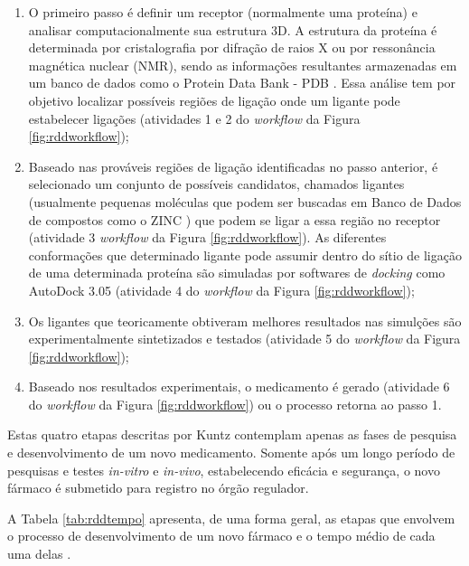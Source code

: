 \begin{enumerate}
  \item O primeiro passo é definir um receptor (normalmente uma proteína) \cite{dre00} e analisar computacionalmente sua estrutura 3D. A estrutura da proteína é determinada por cristalografia por difração de raios X ou por ressonância magnética nuclear (NMR)\cite{far99}, sendo as informações resultantes armazenadas em um banco de dados como o Protein Data Bank - PDB \cite{ber00}. Essa análise tem por objetivo localizar possíveis regiões de ligação onde um ligante pode estabelecer ligações (atividades 1 e 2 do \emph{workflow} da Figura \ref{fig:rddworkflow});
  
  \item Baseado nas prováveis regiões de ligação identificadas no passo anterior, é selecionado um conjunto de possíveis candidatos, chamados ligantes (usualmente pequenas moléculas que podem ser buscadas em Banco de Dados de compostos como o ZINC \cite{irw05}) que podem se ligar a essa região no receptor (atividade 3 \emph{workflow} da Figura \ref{fig:rddworkflow}). As diferentes conformações que determinado ligante pode assumir dentro do sítio de ligação de uma determinada proteína são simuladas por softwares de \emph{docking} como AutoDock 3.05 \cite{mor98} (atividade 4 do \emph{workflow} da Figura \ref{fig:rddworkflow});
  
  \item Os ligantes que teoricamente obtiveram melhores resultados nas simulções são experimentalmente sintetizados e testados (atividade 5 do \emph{workflow} da Figura \ref{fig:rddworkflow});
  
  \item Baseado nos resultados experimentais, o medicamento é gerado (atividade 6 do \emph{workflow} da Figura \ref{fig:rddworkflow}) ou o processo retorna ao passo 1.
  
\end{enumerate}
  
  Estas quatro etapas descritas por Kuntz \cite{kun92} contemplam apenas as fases de pesquisa e desenvolvimento de um novo medicamento. 
Somente após um longo período de pesquisas e testes \emph{in-vitro} e \emph{in-vivo}, estabelecendo eficácia e segurança, o novo fármaco é submetido para registro no órgão regulador.

A Tabela \ref{tab:rddtempo} apresenta, de uma forma geral, as etapas que envolvem o processo de desenvolvimento de um novo fármaco e o tempo médio de cada uma delas \cite{kun92}.

